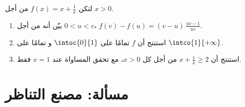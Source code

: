 \begin{exercise}[$\star\star\star$]\label{exo:g11:func:11}
لتكن $f(x) = x + \frac{1}{x}$ من أجل $x > 0$.
\begin{enumerate}
  \item بيّن أنه من أجل $0 < u < v$،
        $f(v) - f(u) = (v - u)\,\frac{uv - 1}{uv}$.
  \item استنتج أن $f$  تمامًا على $\intoc{0}{1}$ و
         تمامًا على $\intco{1}{+\infty}$.
  \item استنتج أن $x + \frac1x \geq 2$ من أجل كل $x > 0$، مع تحقق المساواة
        عند $x = 1$ فقط.
\end{enumerate}
\end{exercise}

\section{مسألة: مصنع التناظر}

